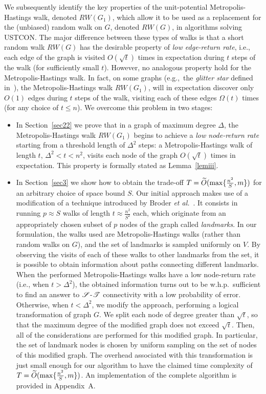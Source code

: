 \documentclass[11pt,a4paper]{article}
\newcommand{\Broder}{Broder \etal}
\newcommand{\etal}{\textsl{et al.}\xspace}
\renewcommand{\O}{\ensuremath \widetilde O}
\newcommand{\s}{\ensuremath  \mathscr S}
\renewcommand{\t}{\ensuremath \mathscr  T}
\renewcommand{\*}{\hspace*{5mm}}
\begin{document}
We subsequently identify the key properties of the unit-potential Metropolis-Hastings walk, denoted $RW(G_1)$, which allow it to be used as a replacement for the (unbiased) random walk on $G$, denoted $RW(G)$, in algorithms solving USTCON. The major difference between these types of walks is that a short random walk $RW(G)$ has the desirable property of \emph{low edge-return rate}, i.e., each edge of the graph is visited $O(\sqrt t)$ times in expectation during $t$ steps of the walk (for sufficiently small $t$). However, no analogous property hold for the Metropolis-Hastings walk. In fact, on some graphs (e.g.,\ the \emph{glitter star} defined in~\cite{NOSY}), the Metropolis-Hastings walk $RW(G_1)$, will in expectation discover only $O(1)$ edges during $t$ steps of the walk, visiting each of these edges $\Omega(t)$ times (for any choice of $t\leq n$). We overcome this problem in two stages:
\begin{itemize}

\item In Section~\ref{sec22} we prove that in a graph of maximum degree $\Delta$, the Metropolis-Hastings walk $RW(G_1)$ begins to achieve a \emph{low node-return rate} starting from a threshold length of $\Delta^2$ steps: a Metropolis-Hastings walk of length $t$, $\Delta^2 < t < n^2$, visits each node of the graph $O(\sqrt t)$ times in expectation. This property is formally stated as Lemma~\ref{lemiii}. 

\item In Section~\ref{sec3} we show how to obtain the trade-off $T = \O (\max\{\frac{n^2}{S}, m\})$  for an arbitrary choice of space bound $S$. Our initial approach makes use of a modification of a technique introduced by \Broder~\cite{BKRU}. It consists in running $p \approx S$ walks of length $t \approx \frac{n^2}{S^2}$ each, which originate from an appropriately chosen subset of $p$ nodes of the graph called \emph{landmarks}. In our formulation, the walks used are Metropolis-Hastings walks (rather than random walks on $G$), and the set of landmarks is sampled uniformly on $V$. By observing the visits of each of these walks to other landmarks from the set, it is possible to obtain information about paths connecting different landmarks. When the performed Metropolis-Hastings walks have a low node-return rate (i.e., when $t>\Delta^2$), the obtained information turns out to be w.h.p.\ sufficient to find an answer to $\s$-$\t$ connectivity with a low probability of error. Otherwise, when $t < \Delta^2$, we modify the approach, performing a logical transformation of graph $G$. We split each node of degree greater than $\sqrt t$, so that the maximum degree of the modified graph does not exceed $\sqrt t$. Then, all of the considerations are performed for this modified graph. In particular, the set of landmark nodes is chosen by uniform sampling on the set of nodes of this modified graph. The overhead associated with this transformation is just small enough for our algorithm to have the claimed time complexity of $T = \O (\max\{\frac{n^2}{S}, m\})$. An implementation of the complete algorithm is provided in Appendix~A.
\end{itemize}
\end{document}

